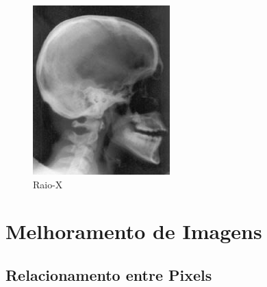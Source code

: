 \documentclass[12pt]{article}
\begin{document}
\begin{figure}[h]
    \centering
    \includegraphics{images/4.jpeg}
    \caption{Raio-X}
    \label{fig:exemplo}
\end{figure}
\newpage

\section{Melhoramento de Imagens}

\subsection{Relacionamento entre Pixels}
\end{document}
